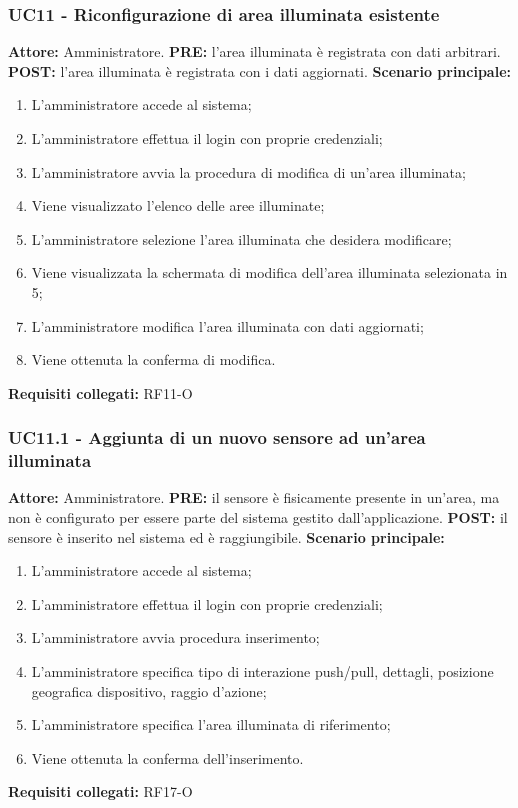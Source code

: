 \documentclass[a4paper, 12pt]{article}
\begin{document}
\subsubsection{UC11 - Riconfigurazione di area illuminata esistente}
\textbf{Attore:} Amministratore.\newline
\textbf{PRE:} l'area illuminata è registrata con dati arbitrari.\newline
\textbf{POST:} l'area illuminata è registrata con i dati aggiornati.\newline
\textbf{Scenario principale:}
\begin{enumerate}
    \item L'amministratore accede al sistema;
    \item L'amministratore effettua il login con proprie credenziali;
    \item L'amministratore avvia la procedura di modifica di un'area illuminata;
    \item Viene visualizzato l'elenco delle aree illuminate;
    \item L'amministratore selezione l'area illuminata che desidera modificare;
    \item Viene visualizzata la schermata di modifica dell'area illuminata selezionata in 5;
    \item L'amministratore modifica l'area illuminata con dati aggiornati;
    \item Viene ottenuta la conferma di modifica.
\end{enumerate}
\textbf{Requisiti collegati:} RF11-O\newline

\subsubsection{UC11.1 - Aggiunta di un nuovo sensore ad un'area illuminata}
\textbf{Attore:} Amministratore.\newline
\textbf{PRE:} il sensore è fisicamente presente in un'area, ma non è configurato per essere parte del sistema gestito dall'applicazione.\newline
\textbf{POST:} il sensore è inserito nel sistema ed è raggiungibile.\newline
\textbf{Scenario principale:}
\begin{enumerate}
    \item L'amministratore accede al sistema;
    \item L'amministratore effettua il login con proprie credenziali;
    \item L'amministratore avvia procedura inserimento;
    \item L'amministratore specifica tipo di interazione push/pull, dettagli, posizione geografica dispositivo, raggio d'azione;
    \item L'amministratore specifica l'area illuminata di riferimento;
    \item Viene ottenuta la conferma dell'inserimento.
\end{enumerate}
\textbf{Requisiti collegati:} RF17-O\newline
\end{document}
